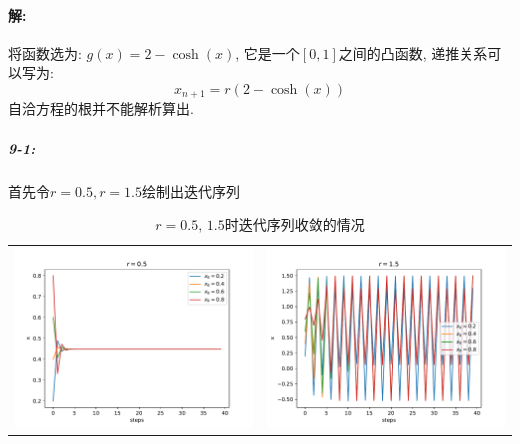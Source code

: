 \documentclass[a4paper,zihao=5,UTF8]{ctexart}
\begin{document}
    \paragraph{解:}
    将函数选为: $g(x) = 2 - \cosh(x)$, 它是一个$[0,1]$之间的凸函数, 递推关系可以写为:
    \begin{equation}
        x_{n+1} = r(2 - \cosh(x))
    \end{equation}
    自洽方程的根并不能解析算出. 
    \subparagraph{9-1:}
    首先令$r=0.5,r=1.5$绘制出迭代序列
    \begin{table}[htbp]
        \centering
        \begin{tabular}[htbp]{cc}
            \includegraphics[scale=0.35]{9_1_0.pdf} & \includegraphics[scale=0.35]{9_1_1.pdf}\\
        \end{tabular}
        \caption{$r=0.5,\,1.5$时迭代序列收敛的情况}
    \end{table}
\end{document}
